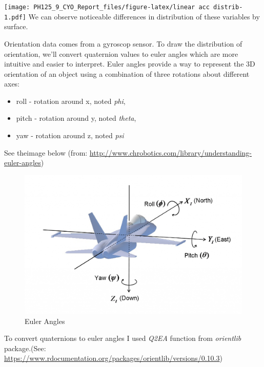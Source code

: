 \documentclass[]{article}
\providecommand{\tightlist}{%
  \setlength{\itemsep}{0pt}\setlength{\parskip}{0pt}}
\begin{document}
\texttt{[image: PH125\_9\_CYO\_Report\_files/figure-latex/linear acc distrib-1.pdf]}
We can observe noticeable differences in distribution of these variables
by surface.

Orientation data comes from a gyroscop sensor. To draw the distribution
of orientation, we'll convert quaternion values to euler angles which
are more intuitive and easier to interpret. Euler angles provide a way
to represent the 3D orientation of an object using a combination of
three rotations about different axes:

\begin{itemize}
\tightlist
\item
  roll - rotation around x, noted \emph{phi},
\item
  pitch - rotation around y, noted \emph{theta},
\item
  yaw - rotation around z, noted \emph{psi}
\end{itemize}

See theimage below (from:
\url{http://www.chrobotics.com/library/understanding-euler-angles})

\begin{figure}
\includegraphics[width=0.6\linewidth]{image_euler_angles} \caption{Euler Angles}\label{fig:euler angles image}
\end{figure}

To convert quaternions to euler angles I used \emph{Q2EA} function from
\emph{orientlib} package.(See:
\url{https://www.rdocumentation.org/packages/orientlib/versions/0.10.3})
\end{document}
